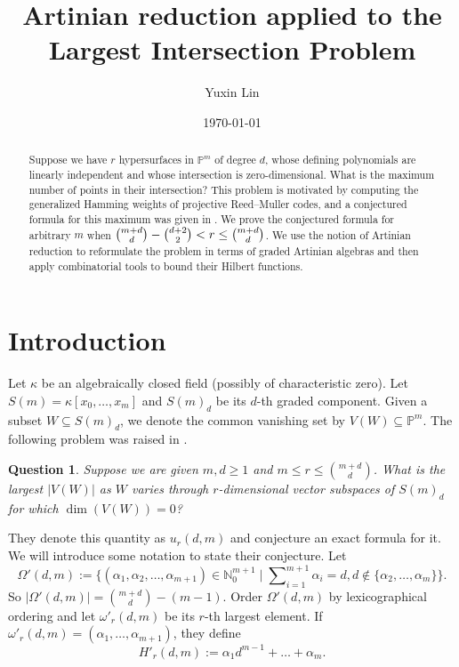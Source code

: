\documentclass[11pt]{amsart}
\title{Artinian reduction applied to the Largest Intersection Problem}
\author{Yuxin Lin}
\date{\today}
\newtheorem{question}[theorem]{Question}
\theoremstyle{definition}
\newcommand{\N}{\mathbb{N}}
\newcommand{\PP}{\mathbb{P}}
\newcommand{\ka}{\kappa}
\newcommand{\tsum}{\mathop{\textstyle\sum}\nolimits}
\begin{document}
\begin{abstract}
Suppose we have $r$ hypersurfaces in $\PP^m$ of degree $d$, whose defining polynomials are linearly independent and whose intersection is zero-dimensional. What is the maximum number of points in their intersection? This problem is motivated by computing the generalized Hamming weights of projective Reed–Muller codes, and a conjectured formula for this maximum was given in \cite{lin2026largest}. We prove the conjectured formula for arbitrary $m$ when $\tbinom{m+d}{d}-\binom{d+2}{2}<r\leq\tbinom{m+d}{d}$. We use the notion of Artinian reduction to reformulate the problem in terms of graded Artinian algebras and then apply combinatorial tools to bound their Hilbert functions.



\end{abstract}

\maketitle

\section{Introduction}

Let $\ka$ be an algebraically closed field (possibly of characteristic zero).
Let $S(m)=\ka[x_0,\dots,x_m]$ and $S(m)_d$ be its $d$-th graded component. 
Given a subset $W\subseteq S(m)_d$, we denote the common vanishing set by $V(W) \subseteq \PP^{m}$.
The following problem was raised in \cite{lin2026largest}.
\begin{question}\label{Question: zero dim problem}
Suppose we are given $m,d\geq 1$ and $m\leq r\leq \binom{m+d}{d}$. What is the largest $|V(W)|$ as $W$ varies through $r$-dimensional vector subspaces of $S(m)_d$ for which $\dim(V(W))=0$?
\end{question}
They denote this quantity as $u_r(d,m)$ and conjecture an exact formula for it.
We will introduce some notation to state their conjecture.
Let
\[
\Omega'(d,m)
:=\Big\{
(\alpha_1,\alpha_{2},\dots,\alpha_{m+1})\in \N_0^{m+1}
\mid \tsum_{i=1}^{m+1}\alpha_i=d, 
d\notin\{\alpha_2,\dots,\alpha_{m}\}  
\Big\}.
\]
So $|\Omega'(d,m)|=\binom{m+d}{d}-(m-1)$. Order $\Omega'(d,m)$ by lexicographical ordering and let $\omega'_r(d,m)$ be its $r$-th largest element. If $\omega'_r(d,m)=(\alpha_1,\dots,\alpha_{m+1})$, they define
\[
H'_{r}(d,m)
:=\alpha_1 d^{m-1}+\dots+\alpha_m.
\]
\end{document}
